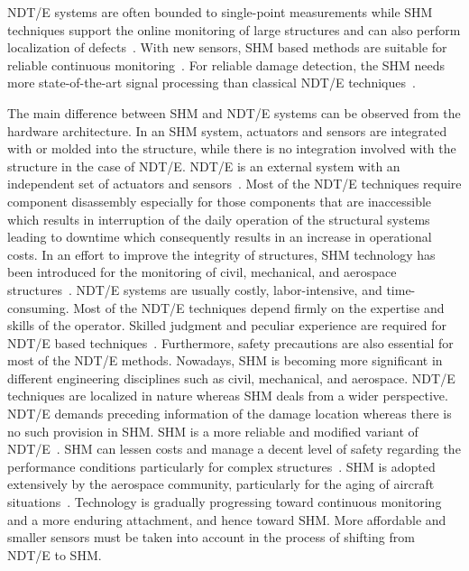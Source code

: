 \documentclass[b5paper, 11pt, titlepage]{book}
\begin{document}
NDT/E systems are often bounded to single-point measurements while SHM techniques support the online monitoring of large structures and can also perform localization of defects~\cite{stepinski2013advanced}. With new sensors, SHM based methods are suitable for reliable continuous monitoring~\cite{heslehurst2014defects}. For reliable damage detection, the SHM needs more state-of-the-art signal processing than classical NDT/E techniques~\cite{stepinski2013advanced}.

The main difference between SHM and NDT/E systems can be observed from the hardware architecture. In an SHM system, actuators and sensors are integrated with or molded into the structure, while there is no integration involved with the structure in the case of NDT/E. NDT/E is an external system with an independent set of actuators and sensors~\cite{stepinski2013advanced}.
Most of the NDT/E techniques require component disassembly especially for those components that are inaccessible which results in interruption of the daily operation of the structural systems leading to downtime which consequently results in an increase in operational costs. In an effort to improve the integrity of structures, SHM technology has been introduced for the monitoring of civil, mechanical, and aerospace structures~\cite{gopalakrishnan2011computational}.  
NDT/E systems are usually costly, labor-intensive, and time-consuming. Most of the NDT/E techniques depend firmly on the expertise and skills of the operator. Skilled judgment and peculiar experience are required for NDT/E based techniques~\cite{jawaid2018structural}. Furthermore, safety precautions are also essential for most of the NDT/E methods. Nowadays, SHM is becoming more significant in different engineering disciplines such as civil, mechanical, and aerospace. NDT/E techniques are localized in nature whereas SHM deals from a wider perspective. NDT/E demands preceding information of the damage location whereas there is no such provision in SHM. SHM is a more reliable and modified variant of NDT/E~\cite{jawaid2018structural}. SHM can lessen costs and manage a decent level of safety regarding the performance conditions particularly for complex structures~\cite{Balageas2010}. SHM is adopted extensively by the aerospace community, particularly for the aging of aircraft situations~\cite{chang2002introduction}. Technology is gradually progressing toward continuous monitoring and a more enduring attachment, and hence toward SHM. More affordable and smaller sensors must be taken into account in the process of shifting from NDT/E to SHM.
\end{document}
